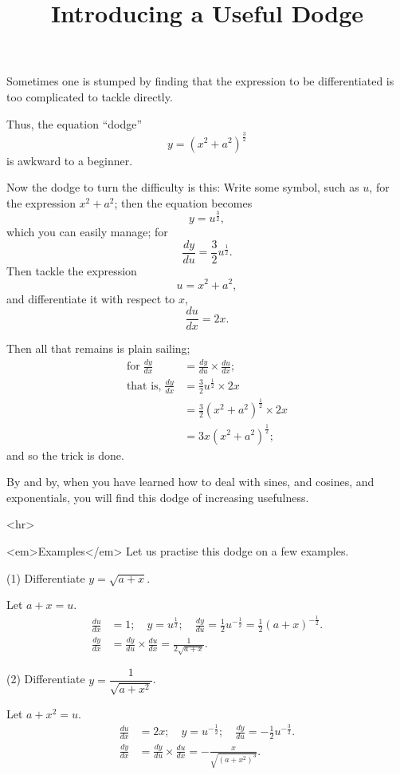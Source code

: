 \documentclass{ximera}
\title{Introducing a Useful Dodge}
\begin{document}
\begin{abstract}
\end{abstract}
\maketitle

Sometimes one is stumped by finding that the expression
to be differentiated is too complicated to
tackle directly.

Thus, the equation ``dodge''
\[
y = (x^2+a^2)^{\frac{3}{2}}
\]
is awkward to a beginner.

Now the dodge to turn the difficulty is this: Write
some symbol, such as $u$, for the expression $x^2 + a^2$;
then the equation becomes
\[
y = u^{\frac{3}{2}},
\]
which you can easily manage; for
\[
\frac{dy}{du} = \frac{3}{2} u^{\frac{1}{2}}.
\]
Then tackle the expression
\[
u = x^2 + a^2,
\]
and differentiate it with respect to $x$,
\[
\frac{du}{dx} = 2x.
\]

Then all that remains is plain sailing;
\begin{align*}
 \text{for}\;
\frac{dy}{dx} &= \frac{dy}{du} \times \frac{du}{dx}; \\
 \text{that is,}\;
\frac{dy}{dx}
  &= \frac{3}{2} u^{\frac{1}{2}} \times 2x \\
  &= \tfrac{3}{2} (x^2 + a^2)^{\frac{1}{2}} \times 2x \\
  &= 3x(x^2 + a^2)^{\frac{1}{2}};
\end{align*}
and so the trick is done.

By and by, when you have learned how to deal
with sines, and cosines, and exponentials, you will
find this dodge of increasing usefulness.

<hr>

<em>Examples</em>
Let us practise this dodge on a few examples.


(1) Differentiate $y = \sqrt{a+x}$.

Let $a+x = u$.
\begin{align*}
\frac{du}{dx} &= 1;\quad y=u^{\frac{1}{2}};\quad
  \frac{dy}{du} = \tfrac{1}{2} u^{-\frac{1}{2}}
                = \tfrac{1}{2} (a+x)^{-\frac{1}{2}}.\\
\frac{dy}{dx} &= \frac{dy}{du} \times \frac{du}{dx} = \frac{1}{2\sqrt{a+x}}.
\end{align*}

(2) Differentiate  $y = \dfrac{1}{\sqrt{a+x^2}}$.

Let $a + x^2 = u$.
\begin{align*}
\frac{du}{dx} &= 2x;\quad y=u^{-\frac{1}{2}};\quad
  \frac{dy}{du} = -\tfrac{1}{2}u^{-\frac{3}{2}}.\\
\frac{dy}{dx} &= \frac{dy}{du}\times\frac{du}{dx} = - \frac{x}{\sqrt{(a+x^2)^3}}.
\end{align*}
\end{document}

